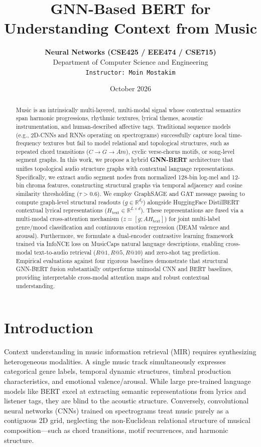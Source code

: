 \documentclass{article}
\title{\textbf{GNN-Based BERT for Understanding Context from Music}}
\author{
  \textbf{Neural Networks (CSE425 / EEE474 / CSE715)}\\
  Department of Computer Science and Engineering\\
  \texttt{Instructor: Moin Mostakim}
}
\date{October 2026}
\begin{document}
\maketitle

\begin{abstract}
Music is an intrinsically multi-layered, multi-modal signal whose contextual semantics span harmonic progressions, rhythmic textures, lyrical themes, acoustic instrumentation, and human-described affective tags. Traditional sequence models (e.g., 2D-CNNs and RNNs operating on spectrograms) successfully capture local time-frequency textures but fail to model relational and topological structures, such as repeated chord transitions ($C \to G \to Am$), cyclic verse-chorus motifs, or song-level segment graphs. In this work, we propose a hybrid \textbf{GNN-BERT} architecture that unifies topological audio structure graphs with contextual language representations. Specifically, we extract audio segment nodes from normalized 128-bin log-mel and 12-bin chroma features, constructing structural graphs via temporal adjacency and cosine similarity thresholding ($\tau > 0.6$). We employ GraphSAGE and GAT message passing to compute graph-level structural readouts ($g \in \mathbb{R}^{d_g}$) alongside HuggingFace DistilBERT contextual lyrical representations ($H_{\text{text}} \in \mathbb{R}^{L \times d}$). These representations are fused via a multi-modal cross-attention mechanism ($z = [g; A H_{\text{text}}]$) for joint multi-label genre/mood classification and continuous emotion regression (DEAM valence and arousal). Furthermore, we formulate a dual-encoder contrastive learning framework trained via InfoNCE loss on MusicCaps natural language descriptions, enabling cross-modal text-to-audio retrieval ($R@1, R@5, R@10$) and zero-shot tag prediction. Empirical evaluations against four rigorous baselines demonstrate that structural GNN-BERT fusion substantially outperforms unimodal CNN and BERT baselines, providing interpretable cross-modal attention maps and robust contextual understanding.
\end{abstract}

\section{Introduction}
Context understanding in music information retrieval (MIR) requires synthesizing heterogeneous modalities. A single music track simultaneously expresses categorical genre labels, temporal dynamic structures, timbral production characteristics, and emotional valence/arousal. While large pre-trained language models like BERT excel at extracting semantic representations from lyrics and listener tags, they are blind to the acoustic structure. Conversely, convolutional neural networks (CNNs) trained on spectrograms treat music purely as a contiguous 2D grid, neglecting the non-Euclidean relational structure of musical composition—such as chord transitions, motif recurrences, and harmonic structure.
\end{document}
